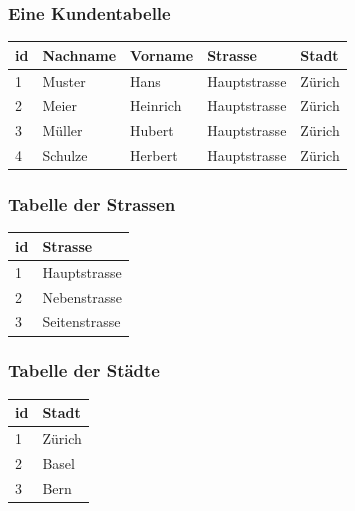       \begin{frame}
      \frametitle{Eine Kundentabelle}
        \begin{center}
          \begin{tabular}{lllll}
            id & Nachname & Vorname & Strasse & Stadt\\
            \hline
            1 & Muster & Hans & Hauptstrasse & Zürich\\
            2 & Meier & Heinrich & Hauptstrasse & Zürich\\
            3 & Müller & Hubert & Hauptstrasse & Zürich\\
            4 & Schulze & Herbert & Hauptstrasse & Zürich\\
          \end{tabular}
        \end{center}
      \end{frame}


      \begin{frame}
      \frametitle{Tabelle der Strassen}
        \begin{center}
          \begin{tabular}{ll}
            id & Strasse\\
            \hline
            1 & Hauptstrasse\\
            2 & Nebenstrasse\\
            3 & Seitenstrasse\\
          \end{tabular}
        \end{center}
      \end{frame}

      \begin{frame}
      \frametitle{Tabelle der Städte}
        \begin{center}
          \begin{tabular}{ll}
            id & Stadt\\
            \hline
            1 & Zürich\\
            2 & Basel\\
            3 & Bern\\
          \end{tabular}
        \end{center}
      \end{frame}


